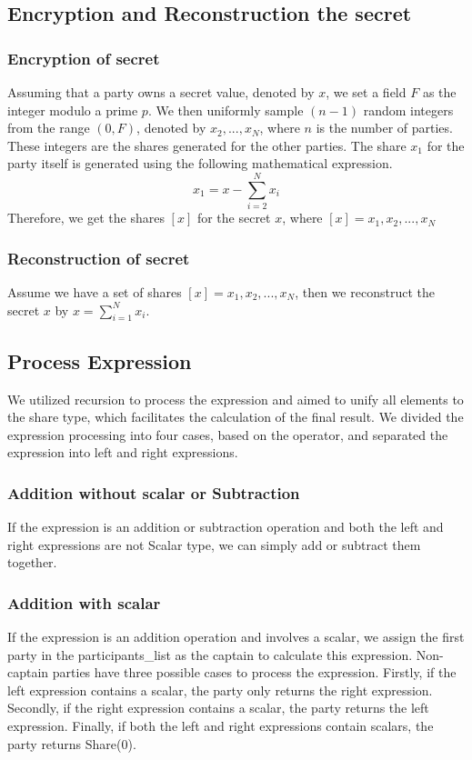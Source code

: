\documentclass[10pt,conference,compsocconf]{IEEEtran}
\begin{document}
\subsection{Encryption and Reconstruction the secret}
\subsubsection{Encryption of secret} 
Assuming that a party owns a secret value, denoted by $x$, we set a field $F$ as the integer modulo a prime $p$. We then uniformly sample $(n-1)$ random integers from the range $(0, F)$, denoted by $x_2, ..., x_N$, where $n$ is the number of parties. These integers are the shares generated for the other parties. The share $x_1$ for the party itself is generated using the following mathematical expression.
\begin{equation}
x_1 = x -  {\textstyle \sum_{i=2}^{N}} x_i
\end{equation}
Therefore, we get the shares $[x]$ for the secret $x$, where $[x] = {x_1, x_2, ..., x_N}$

\subsubsection{Reconstruction of secret}
Assume we have a set of shares $[x] = {x_1, x_2, ..., x_N}$, then we reconstruct the secret $x$ by $ x = {\textstyle \sum_{i=1}^{N}} x_i$.


\subsection{Process Expression}
We utilized recursion to process the expression and aimed to unify all elements to the share type, which facilitates the calculation of the final result. We divided the expression processing into four cases, based on the operator, and separated the expression into left and right expressions.
\subsubsection{Addition without scalar or Subtraction}
If the expression is an addition or subtraction operation and both the left and right expressions are not Scalar type, we can simply add or subtract them together.
\subsubsection{Addition with scalar}
If the expression is an addition operation and involves a scalar, we assign the first party in the participants\_list as the captain to calculate this expression. Non-captain parties have three possible cases to process the expression. Firstly, if the left expression contains a scalar, the party only returns the right expression. Secondly, if the right expression contains a scalar, the party returns the left expression. Finally, if both the left and right expressions contain scalars, the party returns Share(0).
\end{document}
